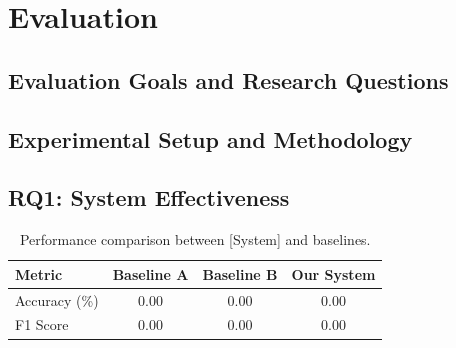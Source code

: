 
\section{Evaluation}
\label{sec:evaluation}


\subsection{Evaluation Goals and Research Questions}
\label{subsec:eval_goals}


\subsection{Experimental Setup and Methodology}
\label{subsec:eval_setup}


\subsection{RQ1: System Effectiveness}
\label{subsec:rq1_results}


\begin{table}[h]
	\centering
	\caption{Performance comparison between [System] and baselines.}
	\label{tab:performance_comparison}
	\begin{tabular}{lccc}
		\toprule
		\textbf{Metric} & \textbf{Baseline A} & \textbf{Baseline B} & \textbf{Our System} \\
		\midrule
		Accuracy (\%)   & 0.00                & 0.00                & 0.00                \\
		F1 Score        & 0.00                & 0.00                & 0.00                \\
		\bottomrule
	\end{tabular}
\end{table}

